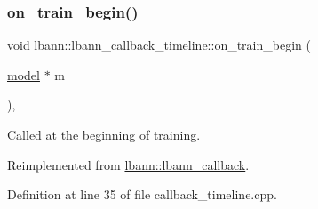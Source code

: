\subsubsection{\texorpdfstring{on\+\_\+train\+\_\+begin()}{on\_train\_begin()}}
{\footnotesize\ttfamily void lbann\+::lbann\+\_\+callback\+\_\+timeline\+::on\+\_\+train\+\_\+begin (\begin{DoxyParamCaption}\item[{\hyperlink{classlbann_1_1model}{model} $\ast$}]{m }\end{DoxyParamCaption})\hspace{0.3cm}{\ttfamily [override]}, {\ttfamily [virtual]}}

Called at the beginning of training. 

Reimplemented from \hyperlink{classlbann_1_1lbann__callback_a7c8f0d211967ccc5219144e92571ab26}{lbann\+::lbann\+\_\+callback}.



Definition at line 35 of file callback\+\_\+timeline.\+cpp.



